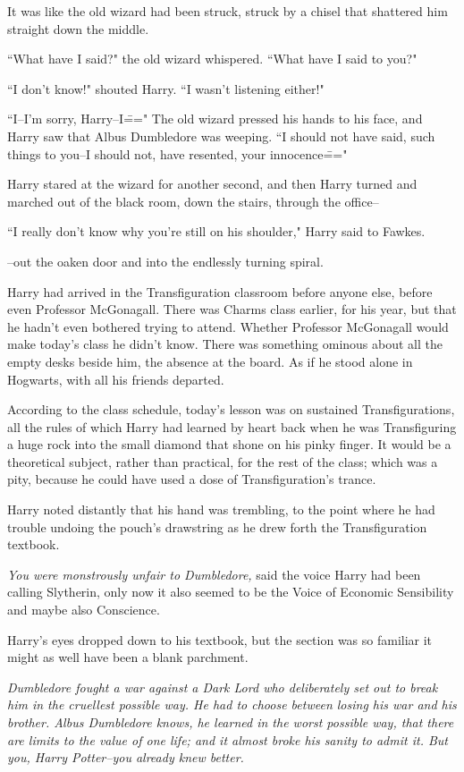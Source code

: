 It was like the old wizard had been struck, struck by a chisel that shattered him straight down the middle.

``What have I said?" the old wizard whispered. ``What have I said to you?"

``I don't know!" shouted Harry. ``I wasn't listening either!"

``I\---I'm sorry, Harry\---I\===" The old wizard pressed his hands to his face, and Harry saw that Albus Dumbledore was weeping. ``I should not have said, such things to you\---I should not, have resented, your innocence\==="

Harry stared at the wizard for another second, and then Harry turned and marched out of the black room, down the stairs, through the office\---

``I really don't know why you're still on his shoulder," Harry said to Fawkes.

\---out the oaken door and into the endlessly turning spiral.

\later

Harry had arrived in the Transfiguration classroom before anyone else, before even Professor McGonagall. There was Charms class earlier, for his year, but that he hadn't even bothered trying to attend. Whether Professor McGonagall would make today's class he didn't know. There was something ominous about all the empty desks beside him, the absence at the board. As if he stood alone in Hogwarts, with all his friends departed.

According to the class schedule, today's lesson was on sustained Transfigurations, all the rules of which Harry had learned by heart back when he was Transfiguring a huge rock into the small diamond that shone on his pinky finger. It would be a theoretical subject, rather than practical, for the rest of the class; which was a pity, because he could have used a dose of Transfiguration's trance.

Harry noted distantly that his hand was trembling, to the point where he had trouble undoing the pouch's drawstring as he drew forth the Transfiguration textbook.

\emph{You were monstrously unfair to Dumbledore,} said the voice Harry had been calling Slytherin, only now it also seemed to be the Voice of Economic Sensibility and maybe also Conscience.

Harry's eyes dropped down to his textbook, but the section was so familiar it might as well have been a blank parchment.

\emph{Dumbledore fought a war against a Dark Lord who deliberately set out to break him in the cruellest possible way. He had to choose between losing his war and his brother. Albus Dumbledore knows, he learned in the worst possible way, that there are limits to the value of one life; and it almost broke his sanity to admit it. But you, Harry Potter\---\emph{you} already knew better.}

